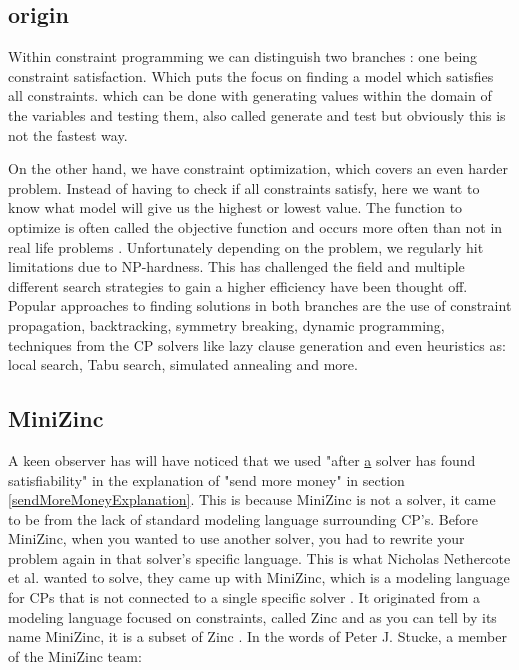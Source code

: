 \subsection{origin}
Within constraint programming we can distinguish two branches \cite{52bartak1999constraint}: one being constraint satisfaction. Which puts the focus on finding a model which satisfies all constraints. which can be done with generating values within the domain of the variables and testing them, also called generate and test but obviously this is not the fastest way. 

On the other hand, we have constraint optimization, which covers an even harder problem. Instead of having to check if all constraints satisfy, here we want to know what model will give us the highest or lowest value. The function to optimize is often called the objective function and occurs more often than not in real life problems \cite{52bartak1999constraint}. 
Unfortunately depending on the problem, we regularly hit limitations due to NP-hardness. This has challenged the field and multiple different search strategies to gain a higher efficiency have been thought off. Popular approaches to finding solutions in both branches are the use of constraint propagation, backtracking, symmetry breaking, dynamic programming, techniques from the CP solvers like lazy clause generation and even heuristics as: local search, Tabu search, simulated annealing and more. 

\subsection{MiniZinc}
A keen observer has will have noticed that we used "after \underline{a} solver has found satisfiability" in the explanation of "send more money" in section \ref{sendMoreMoneyExplanation}. 
This is because MiniZinc is not a solver, it came to be from the lack of standard modeling language surrounding CP's. Before MiniZinc, when you wanted to use another solver, you had to rewrite your problem again in that solver's specific language. This is what Nicholas Nethercote et al. wanted to solve, they came up with MiniZinc, which is a modeling language for CPs that is not connected to a single specific solver \cite{57nethercote2007minizinc}. It originated from a modeling language focused on constraints, called Zinc \cite{68incbanda2006modelling} and as you can tell by its name MiniZinc, it is a subset of Zinc \cite{57nethercote2007minizinc}.
In the words of Peter J. Stucke, a member of the MiniZinc team: 

